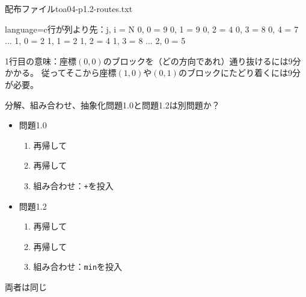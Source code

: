 \documentclass{beamer}
\begin{document}
\begin{frame}[fragile]{配布ファイル}{toa04-p1.2-routes.txt}
\begin{codeof}{language=c}{行が列より先：j, i = N}
 0, 0 = 9
 0, 1 = 9
 0, 2 = 4
 0, 3 = 8
 0, 4 = 7
...
 1, 0 = 2
 1, 1 = 2
 1, 2 = 4
 1, 3 = 8
...
 2, 0 = 5
\end{codeof}

1行目の意味：座標$(0, 0)$のブロックを（どの方向であれ）通り抜けるには9分かかる。
従ってそこから座標$(1,0)$や$(0,1)$のブロックにたどり着くには9分が必要。
\end{frame}

\begin{frame}[fragile]{分解、組み合わせ、抽象化}{問題1.0と問題1.2は別問題か？}
\begin{itemize}\itemsep20pt
\item 問題1.0
\begin{enumerate}%
\item 再帰して
\item 再帰して
\item 組み合わせ：\texttt{+}を投入
\end{enumerate}
\item 問題1.2
\begin{enumerate}%
\item 再帰して
\item 再帰して
\item 組み合わせ：\texttt{min}を投入
\end{enumerate}
\end{itemize}

\vfill
両者は同じ
\end{frame}
\end{document}
